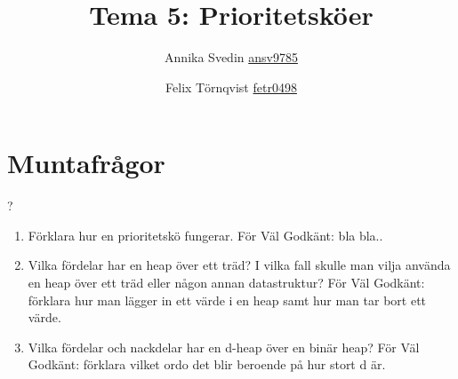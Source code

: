 \documentclass[a5paper,10pt,oneside]{article}
\title{Tema 5: Prioritetsköer}
\author{Annika Svedin \url{ansv9785} \and Felix Törnqvist \url{fetr0498}}
\begin{document}
\maketitle

\section*{Muntafrågor}
?
\begin{enumerate}
	\item Förklara hur en prioritetskö fungerar. För Väl Godkänt: bla bla..
	
	\item Vilka fördelar har en heap över ett träd? I vilka fall skulle man vilja använda en heap över ett träd eller någon annan datastruktur? För Väl Godkänt: förklara hur man lägger in ett värde i en heap samt hur man tar bort ett värde.
	
	\item
	Vilka fördelar och nackdelar har en d-heap över en binär heap? För Väl Godkänt: förklara vilket ordo det blir beroende på hur stort d är.
\end{enumerate}
\end{document}
